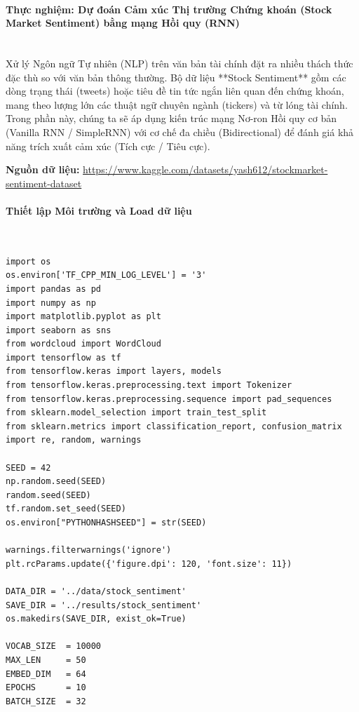 \paragraph{Thực nghiệm: Dự đoán Cảm xúc Thị trường Chứng khoán (Stock Market Sentiment) bằng mạng Hồi quy (RNN)} \hfill \\

Xử lý Ngôn ngữ Tự nhiên (NLP) trên văn bản tài chính đặt ra nhiều thách thức đặc thù so với văn bản thông thường. Bộ dữ liệu **Stock Sentiment** gồm các dòng trạng thái (tweets) hoặc tiêu đề tin tức ngắn liên quan đến chứng khoán, mang theo lượng lớn các thuật ngữ chuyên ngành (tickers) và từ lóng tài chính. Trong phần này, chúng ta sẽ áp dụng kiến trúc mạng Nơ-ron Hồi quy cơ bản (Vanilla RNN / SimpleRNN) với cơ chế đa chiều (Bidirectional) để đánh giá khả năng trích xuất cảm xúc (Tích cực / Tiêu cực).

\begin{center}
    \textbf{Nguồn dữ liệu:} \url{https://www.kaggle.com/datasets/yash612/stockmarket-sentiment-dataset}
\end{center}

\paragraph{Thiết lập Môi trường và Load dữ liệu} \hfill \\

\begin{lstlisting}[style=pythoncode, caption={Khởi tạo môi trường thư viện cho bài toán NLP}]
import os
os.environ['TF_CPP_MIN_LOG_LEVEL'] = '3'
import pandas as pd
import numpy as np
import matplotlib.pyplot as plt
import seaborn as sns
from wordcloud import WordCloud
import tensorflow as tf
from tensorflow.keras import layers, models
from tensorflow.keras.preprocessing.text import Tokenizer
from tensorflow.keras.preprocessing.sequence import pad_sequences
from sklearn.model_selection import train_test_split
from sklearn.metrics import classification_report, confusion_matrix
import re, random, warnings

SEED = 42
np.random.seed(SEED)
random.seed(SEED)
tf.random.set_seed(SEED)
os.environ["PYTHONHASHSEED"] = str(SEED)

warnings.filterwarnings('ignore')
plt.rcParams.update({'figure.dpi': 120, 'font.size': 11})

DATA_DIR = '../data/stock_sentiment'
SAVE_DIR = '../results/stock_sentiment'
os.makedirs(SAVE_DIR, exist_ok=True)

VOCAB_SIZE  = 10000
MAX_LEN     = 50
EMBED_DIM   = 64
EPOCHS      = 10
BATCH_SIZE  = 32
\end{lstlisting}


